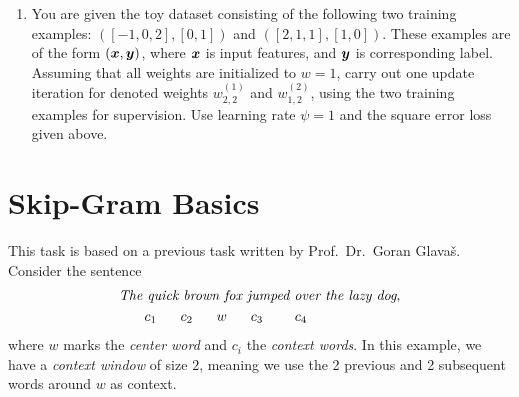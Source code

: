 \documentclass[11pt,a4paper]{article}
\begin{document}
\begin{enumerate}[label=(\alph*)]
\begin{enumerate}[label=(\roman*)]
                    \begin{align*}
                        L & = -\frac{1}{2}\frac{1}{N}\sum_{e=1}^{N} \sum_{l=1}^{M} (t_{e,l}-y_{e,l})^2.
                    \end{align*}
                    where $N$ is size of the training set, $M$ is number of 
                    labels, $t_{e,l}$ the target label $l$ of example $e$ and 
                    $y_{e,l}$ the corresponding prediction made by the model.
                    Note that in this toy setting, $M = N = 2$.
                    Using squared error loss for a classification task is not a
                    common setting, but it is useful for us to construct a 
                    simple example to study backpropagation.
              \item You are given the toy dataset consisting of the following 
                    two training examples: $([-1, 0, 2], [0, 1])$ and
                    $([2, 1, 1], [1, 0])$.
                    These examples are of the form $({\boldsymbol{x}}, {\boldsymbol{y}})$, where ${\boldsymbol{x}}$
                    is input features, and ${\boldsymbol{y}}$ is corresponding label.
                    Assuming that all weights are initialized to $w = 1$, carry 
                    out one update iteration for denoted weights $w^{(1)}_{2,2}$ 
                    and $w^{(2)}_{1,2}$, using the two training examples for 
                    supervision.
                    Use learning rate $\psi = 1$ and the square error 
                    loss given above.
          \end{enumerate}
\end{enumerate}

\section{Skip-Gram Basics}

This task is based on a previous task written by Prof.\ Dr.\ Goran Glava\v{s}. \\

Consider the sentence
\begin{align*}
    \textit{The quick brown fox jumped over the lazy dog}, \\
    c_1 \hspace{0.60cm}
    c_2 \hspace{0.60cm}
    w \hspace{0.60cm}
    c_3 \hspace{0.80cm}
    c_4 \hspace{2.35cm}
\end{align*}
where $w$ marks the \emph{center word} and $c_i$ the \emph{context words}.
In this example, we have a \emph{context window} of size $2$, meaning we use the
2 previous and 2 subsequent words around $w$ as context.
\end{document}
